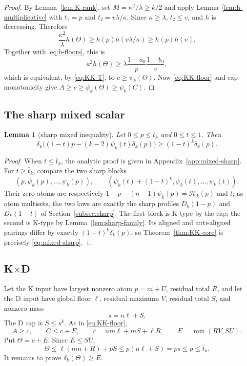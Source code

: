 \documentclass[11pt]{article}
\newtheorem{lemma}[theorem]{Lemma}
\theoremstyle{definition}
\theoremstyle{remark}
\begin{document}
\begin{proof}
By Lemma~\ref{lem:K-rank}, set $M=\kappa^2/\lambda\ge k/2$ and apply
Lemma~\ref{lem:h-multiplicative} with $t_1=p$ and
$t_2=v\lambda/\kappa$.  Since $\kappa\ge\lambda$, $t_2\le v$, and
$h$ is decreasing.  Therefore
\[
 \frac{\kappa^2}{\lambda}h(\Theta)
 \ge h(p)h(v\lambda/\kappa)\ge h(p)h(v).
\]
Together with \eqref{eq:h-floors}, this is
\[
 \kappa^2h(\Theta)\ge
 \lambda\frac{1-a_0}{p}\frac{1-b_0}{v},
\]
which is equivalent, by \eqref{eq:KK-T}, to $c\ge\psi_k(\Theta)$.  Now
\eqref{eq:KK-floor} and cap monotonicity give
$A\ge c\ge\psi_k(\Theta)\ge\psi_k(C)$.
\end{proof}

\subsection{The sharp mixed scalar}

\begin{lemma}[sharp mixed inequality]\label{lem:mixed-sharp}
Let $0\le p\le\bar t_k$ and $0\le t\le1$.  Then
\begin{equation}\label{eq:mixed-sharp}
 \delta_k\bigl((1-t)p-(k-2)\psi_k(t)\delta_k(p)\bigr)
 \ge(1-t)^k\delta_k(p).
\end{equation}
\end{lemma}

\begin{proof}
When $t\le\bar t_k$, the analytic proof is given in
Appendix~\ref{app:mixed-sharp}.  For $t\ge\bar t_k$, compare the two sharp
blocks
\[
 (p,\psi_k(p),\ldots,\psi_k(p)),\qquad
 (\psi_k(t)+(1-t)^k,\psi_k(t),\ldots,\psi_k(t)).
\]
Their zero atoms are respectively
$1-p-(n-1)\psi_k(p)=\mathcal H_k(p)$ and $t$; as atom multisets, the two
laws are exactly the sharp profiles $D_k(1-p)$ and $D_k(1-t)$ of
Section~\ref{subsec:sharp}.  The first block is K-type by the cap; the
second is K-type by Lemma~\ref{lem:sharp-family}.  Its aligned and
anti-aligned pairings differ by exactly $(1-t)^k\delta_k(p)$, so
Theorem~\ref{thm:KK-core} is precisely \eqref{eq:mixed-sharp}.
\end{proof}

\subsection{\texorpdfstring{K$\times$D}{K x D}}

Let the K input have largest nonzero atom $p=m+U$, residual total $R$, and
let the D input have global floor $\ell$, residual maximum $V$, residual total
$S$, and nonzero mass
\[
 s=n\ell+S.
\]
The D cap is $S\le s^k$.  As in \eqref{eq:KK-floor},
\begin{equation}\label{eq:KD-floor}
 A\ge c,\qquad C\le c+E,\qquad
 c=nm\ell+mS+\ell R,\qquad E=\min(RV,SU).
\end{equation}
Put $\Theta=c+E$.  Since $E\le SU$,
\begin{equation}\label{eq:KD-cap}
 \Theta\le \ell(nm+R)+pS\le p(n\ell+S)=ps\le p\le\bar t_k.
\end{equation}
It remains to prove $\delta_k(\Theta)\ge E$.
\end{document}
